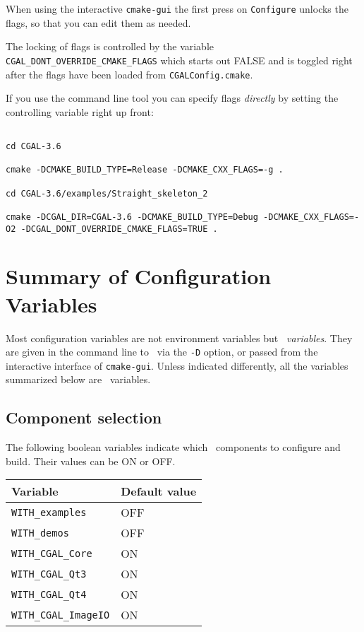 When using the interactive \texttt{cmake-gui} the first press on \texttt{Configure} unlocks
the flags, so that you can edit them as needed. 

\begin{ccAdvanced}
The locking of flags is controlled by the variable {\tt CGAL\_DONT\_OVERRIDE\_CMAKE\_FLAGS}
which starts out FALSE and is toggled right after the flags have been loaded from
\texttt{CGALConfig.cmake}.

If you use the command line tool you can specify flags {\em directly} by setting the
controlling variable right up front:

{\ccTexHtml{\scriptsize}{}
\begin{verbatim}

cd CGAL-3.6

cmake -DCMAKE_BUILD_TYPE=Release -DCMAKE_CXX_FLAGS=-g .

cd CGAL-3.6/examples/Straight_skeleton_2

cmake -DCGAL_DIR=CGAL-3.6 -DCMAKE_BUILD_TYPE=Debug -DCMAKE_CXX_FLAGS=-O2 -DCGAL_DONT_OVERRIDE_CMAKE_FLAGS=TRUE . 

\end{verbatim}
}
\end{ccAdvanced}






\section{Summary of Configuration Variables}

Most configuration variables are not environment variables but {\em \cmake\ variables}. They are given in the command line to \cmake\ via the \texttt{-D} option, 
or passed from the interactive interface of \texttt{cmake-gui}. Unless
indicated differently, all the variables summarized below are \cmake\ variables.

\subsection{Component selection}

The following boolean variables indicate which \cgal\ components to configure and build. Their values can be ON or OFF.

{\ccTexHtml{\small}{}
\renewcommand{\arraystretch}{1.3}
\gdef\lcTabularBorder{2}
\begin{tabular}{|l|l|} \hline
  \textbf{Variable}            & \textbf{Default value}\\\hline\hline
  \texttt{WITH\_examples}      & OFF\\\hline
  \texttt{WITH\_demos}         & OFF\\\hline
  \texttt{WITH\_CGAL\_Core}    & ON\\\hline
  \texttt{WITH\_CGAL\_Qt3}     & ON\\\hline
  \texttt{WITH\_CGAL\_Qt4}     & ON\\\hline
  \texttt{WITH\_CGAL\_ImageIO} & ON\\\hline
\end{tabular}
}

